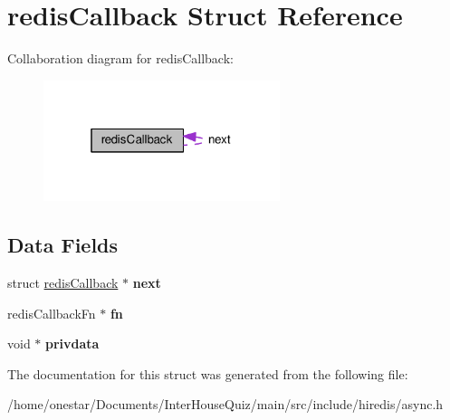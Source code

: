 \hypertarget{structredis_callback}{\section{redis\+Callback Struct Reference}
\label{structredis_callback}
}


Collaboration diagram for redis\+Callback\+:\nopagebreak
\begin{figure}[H]
\begin{center}
\leavevmode
\includegraphics[width=196pt]{structredis_callback__coll__graph}
\end{center}
\end{figure}
\subsection*{Data Fields}
\begin{DoxyCompactItemize}
\item 
\hypertarget{structredis_callback_a1c9b8f0cbd585e6313275a3ad25af7f9}{struct \hyperlink{structredis_callback}{redis\+Callback} $\ast$ {\bfseries next}}\label{structredis_callback_a1c9b8f0cbd585e6313275a3ad25af7f9}

\item 
\hypertarget{structredis_callback_af0f9bf029890f4abde113aa7dc797b3b}{redis\+Callback\+Fn $\ast$ {\bfseries fn}}\label{structredis_callback_af0f9bf029890f4abde113aa7dc797b3b}

\item 
\hypertarget{structredis_callback_ac5df247494dd66a10946e2d67e56b2a1}{void $\ast$ {\bfseries privdata}}\label{structredis_callback_ac5df247494dd66a10946e2d67e56b2a1}

\end{DoxyCompactItemize}


The documentation for this struct was generated from the following file\+:\begin{DoxyCompactItemize}
\item 
/home/onestar/\+Documents/\+Inter\+House\+Quiz/main/src/include/hiredis/async.\+h\end{DoxyCompactItemize}
